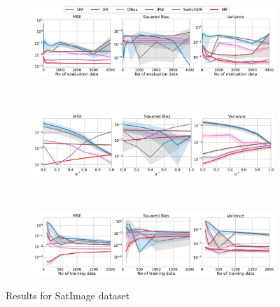 \begin{figure}[h!]
    \centering
	\begin{subfigure}{0.8\textwidth}
	    \centering
	    \includegraphics[width=1\textwidth]{figures/mr/multiclass/ope_vs_n_alphatar_0_2_satimage_ntr1000.png}
	    \label{subfig:sat-neval}
	\end{subfigure}\\
	\begin{subfigure}{0.8\textwidth} 
	    \centering
	    \includegraphics[width=1\textwidth]{figures/mr/multiclass/ope_vs_alphatar_neval_1000_satimage_ntr_1000.png}
	    \label{subfig:sat-ae}
	\end{subfigure}\\
 	\begin{subfigure}{0.8\textwidth} 
	    \centering
	    \includegraphics[width=1\textwidth]{figures/mr/multiclass/ope_vs_ntr_neval_1000_satimage_alpha_0_6.png}
	    \label{subfig:sat-tr}
	\end{subfigure}
    \caption{Results for SatImage dataset}
    \label{fig:satimage}
\end{figure}

